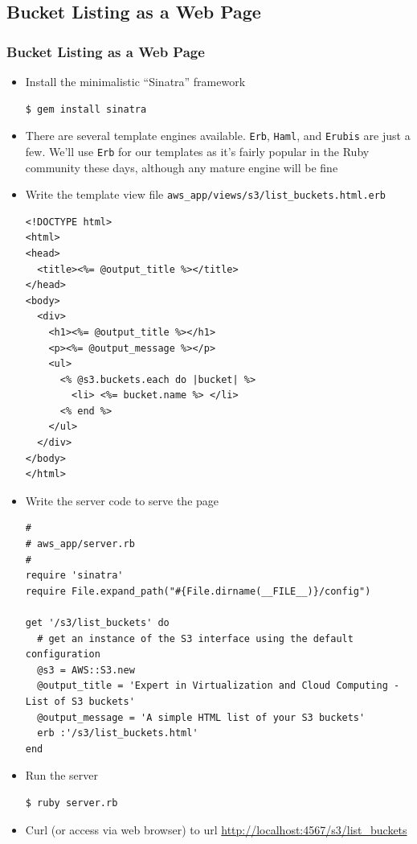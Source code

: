 \documentclass{beamer}
\begin{document}
\subsection{Bucket Listing as a Web Page}
\begin{frame}
\frametitle{Bucket Listing as a Web Page}
\begin{itemize}
\item Install the minimalistic ``Sinatra'' framework
\lstset{language=shell}
\begin{lstlisting}[escapechar=!]
$ gem install sinatra
\end{lstlisting}


\item There are several template engines available. \texttt{Erb}, \texttt{Haml}, and \texttt{Erubis} are
just a few. We’ll use \texttt{Erb} for our templates as it’s fairly popular in the Ruby community these days, 
although any mature engine will be fine

\item Write the template view file \texttt{aws\_app/views/s3/list\_buckets.html.erb}

\lstset{language=Ruby, style=eclipse}
\begin{lstlisting}[escapechar=?]
<!DOCTYPE html>
<html>
<head>
  <title><%= @output_title %></title>
</head>
<body>
  <div>
    <h1><%= @output_title %></h1>
    <p><%= @output_message %></p>
    <ul>
      <% @s3.buckets.each do |bucket| %>
        <li> <%= bucket.name %> </li>
      <% end %>
    </ul>
  </div>
</body>
</html>
\end{lstlisting}


\item Write the server code to serve the page
\lstset{language=Ruby, style=eclipse}
\begin{lstlisting}[escapechar=!]
#
# aws_app/server.rb
#
require 'sinatra'
require File.expand_path("#{File.dirname(__FILE__)}/config")

get '/s3/list_buckets' do
  # get an instance of the S3 interface using the default configuration
  @s3 = AWS::S3.new
  @output_title = 'Expert in Virtualization and Cloud Computing - List of S3 buckets'
  @output_message = 'A simple HTML list of your S3 buckets'
  erb :'/s3/list_buckets.html'
end
\end{lstlisting}

\item Run the server
\lstset{language=shell}
\begin{lstlisting}[escapechar=!]
$ ruby server.rb
\end{lstlisting}

\item Curl (or access via web browser) to url \url{http://localhost:4567/s3/list_buckets}
\end{itemize}
\end{frame}
\end{document}
